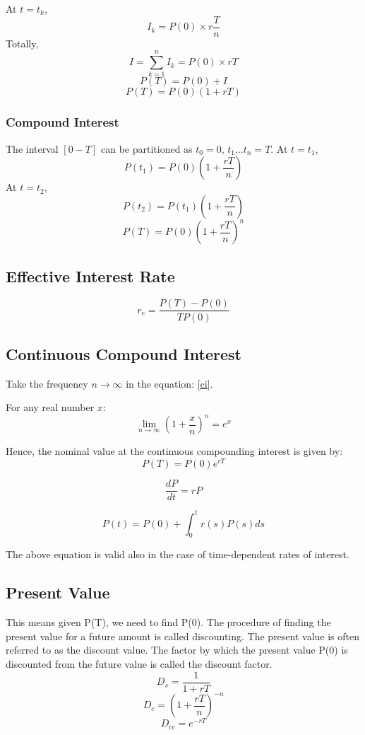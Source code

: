 \documentclass{report}
\begin{document}
At $t = t_k$, 
\[I_k = P(0)\times r \frac{T}{n}\]
Totally, 
\[
I = \sum_{k=1}^nI_k = P(0)\times rT
\]
\[P(T) = P(0)+I\]
\begin{equation}
    P(T) = P(0)(1+rT)
\end{equation}

\subsubsection{Compound Interest}
The interval $[0-T]$ can be partitioned as $t_0=0$, $t_1 \dots t_n=T$.
At $t=t_1$, 
\[P(t_1) = P(0)(1+\frac{rT}{n})\]
At $t=t_2$, 
\[P(t_2) = P(t_1)(1+\frac{rT}{n})\]
\begin{equation}
\label{ci}
    P(T) = P(0)(1+\frac{rT}{n})^n
\end{equation}

\subsection{Effective Interest Rate}
\begin{equation}
    r_e = \frac{P(T)-P(0)}{TP(0)}
\end{equation}

\subsection{Continuous Compound Interest}
Take the frequency $n\longrightarrow\infty$ in the equation: \ref{ci}.


For any real number $x$:
\[
\lim_{n\rightarrow\infty}(1+\frac{x}{n})^n = e^x
\]


Hence, the nominal value at the continuous compounding interest is given by:
\begin{equation}
    P(T) = P(0)e^{rT}
\end{equation}

\begin{equation}
    \frac{dP}{dt} = rP
\end{equation}


\begin{equation}
    P(t) = P(0) + \int_0^tr(s)P(s)ds 
\end{equation}


The above equation is valid also in the case of time-dependent rates of interest.

\subsection{Present Value}
This means given P(T), we need to find P(0). The procedure of finding the present value for a future amount is called discounting. The present value is often referred to as the discount value. The factor by which the present value P(0) is discounted from the future value is called the discount factor.
\begin{equation}
    D_s = \frac{1}{1+rT}
\end{equation}
\begin{equation}
    D_c = (1+\frac{rT}{n})^{-n}
\end{equation}
\begin{equation}
    D_{cc} = e^{-rT}
\end{equation}
\end{document}
